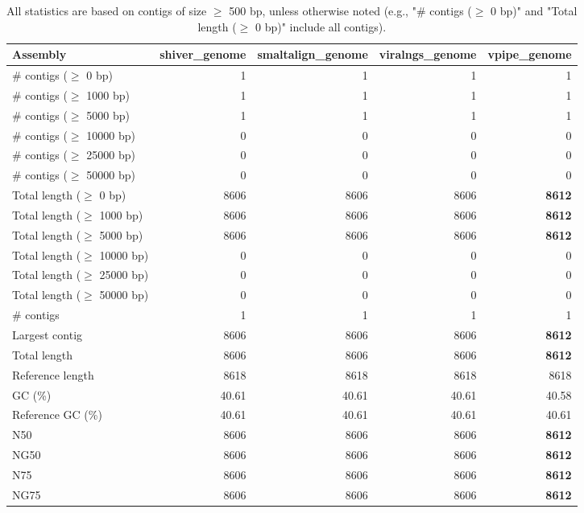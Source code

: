 \documentclass[12pt,a4paper]{article}
\begin{document}
\begin{table}[ht]
\begin{center}
\caption{All statistics are based on contigs of size $\geq$ 500 bp, unless otherwise noted (e.g., "\# contigs ($\geq$ 0 bp)" and "Total length ($\geq$ 0 bp)" include all contigs).}
\begin{tabular}{|l*{4}{|r}|}
\hline
Assembly & shiver\_genome & smaltalign\_genome & viralngs\_genome & vpipe\_genome \\ \hline
\# contigs ($\geq$ 0 bp) & 1 & 1 & 1 & 1 \\ \hline
\# contigs ($\geq$ 1000 bp) & 1 & 1 & 1 & 1 \\ \hline
\# contigs ($\geq$ 5000 bp) & 1 & 1 & 1 & 1 \\ \hline
\# contigs ($\geq$ 10000 bp) & 0 & 0 & 0 & 0 \\ \hline
\# contigs ($\geq$ 25000 bp) & 0 & 0 & 0 & 0 \\ \hline
\# contigs ($\geq$ 50000 bp) & 0 & 0 & 0 & 0 \\ \hline
Total length ($\geq$ 0 bp) & 8606 & 8606 & 8606 & {\bf 8612} \\ \hline
Total length ($\geq$ 1000 bp) & 8606 & 8606 & 8606 & {\bf 8612} \\ \hline
Total length ($\geq$ 5000 bp) & 8606 & 8606 & 8606 & {\bf 8612} \\ \hline
Total length ($\geq$ 10000 bp) & 0 & 0 & 0 & 0 \\ \hline
Total length ($\geq$ 25000 bp) & 0 & 0 & 0 & 0 \\ \hline
Total length ($\geq$ 50000 bp) & 0 & 0 & 0 & 0 \\ \hline
\# contigs & 1 & 1 & 1 & 1 \\ \hline
Largest contig & 8606 & 8606 & 8606 & {\bf 8612} \\ \hline
Total length & 8606 & 8606 & 8606 & {\bf 8612} \\ \hline
Reference length & 8618 & 8618 & 8618 & 8618 \\ \hline
GC (\%) & 40.61 & 40.61 & 40.61 & 40.58 \\ \hline
Reference GC (\%) & 40.61 & 40.61 & 40.61 & 40.61 \\ \hline
N50 & 8606 & 8606 & 8606 & {\bf 8612} \\ \hline
NG50 & 8606 & 8606 & 8606 & {\bf 8612} \\ \hline
N75 & 8606 & 8606 & 8606 & {\bf 8612} \\ \hline
NG75 & 8606 & 8606 & 8606 & {\bf 8612} \\ \hline

\end{tabular}
\end{center}
\end{table}
\end{document}
